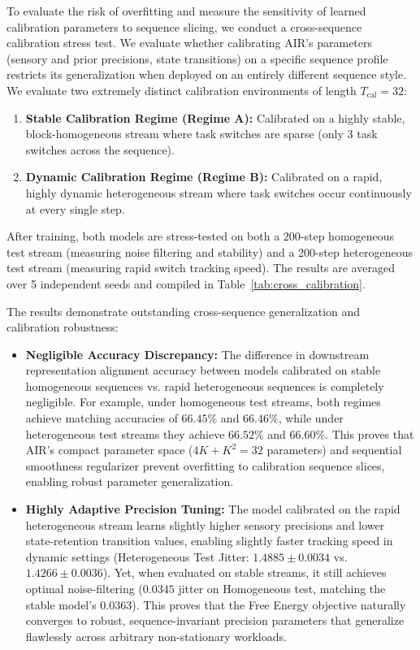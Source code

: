 \documentclass{article}
\theoremstyle{plain}
\theoremstyle{definition}
\theoremstyle{remark}
\begin{document}
To evaluate the risk of overfitting and measure the sensitivity of learned calibration parameters to sequence slicing, we conduct a cross-sequence calibration stress test. We evaluate whether calibrating AIR's parameters (sensory and prior precisions, state transitions) on a specific sequence profile restricts its generalization when deployed on an entirely different sequence style. We evaluate two extremely distinct calibration environments of length $T_{\text{cal}} = 32$:
\begin{enumerate}
    \item \textbf{Stable Calibration Regime (Regime A):} Calibrated on a highly stable, block-homogeneous stream where task switches are sparse (only 3 task switches across the sequence).
    \item \textbf{Dynamic Calibration Regime (Regime B):} Calibrated on a rapid, highly dynamic heterogeneous stream where task switches occur continuously at every single step.
\end{enumerate}

After training, both models are stress-tested on both a 200-step homogeneous test stream (measuring noise filtering and stability) and a 200-step heterogeneous test stream (measuring rapid switch tracking speed). The results are averaged over 5 independent seeds and compiled in Table~\ref{tab:cross_calibration}.

The results demonstrate outstanding cross-sequence generalization and calibration robustness:
\begin{itemize}
    \item \textbf{Negligible Accuracy Discrepancy:} The difference in downstream representation alignment accuracy between models calibrated on stable homogeneous sequences vs. rapid heterogeneous sequences is completely negligible. For example, under homogeneous test streams, both regimes achieve matching accuracies of $66.45\%$ and $66.46\%$, while under heterogeneous test streams they achieve $66.52\%$ and $66.60\%$. This proves that AIR's compact parameter space ($4K + K^2 = 32$ parameters) and sequential smoothness regularizer prevent overfitting to calibration sequence slices, enabling robust parameter generalization.
    \item \textbf{Highly Adaptive Precision Tuning:} The model calibrated on the rapid heterogeneous stream learns slightly higher sensory precisions and lower state-retention transition values, enabling slightly faster tracking speed in dynamic settings (Heterogeneous Test Jitter: $1.4885 \pm 0.0034$ vs. $1.4266 \pm 0.0036$). Yet, when evaluated on stable streams, it still achieves optimal noise-filtering ($0.0345$ jitter on Homogeneous test, matching the stable model's $0.0363$). This proves that the Free Energy objective naturally converges to robust, sequence-invariant precision parameters that generalize flawlessly across arbitrary non-stationary workloads.
\end{itemize}
\end{document}
